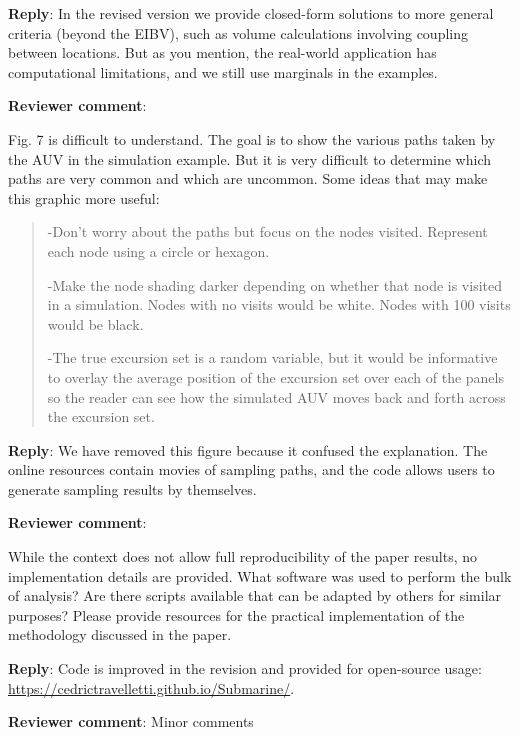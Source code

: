 \documentclass[a4paper]{article}
\def\revcom{\textbf{Reviewer comment}}
\def\reply{\textbf{Reply}}
\begin{document}
\begin{answers}
\reply: In the revised version we provide closed-form solutions to more general criteria (beyond the EIBV), such as volume calculations involving coupling between locations. But as you mention, the real-world application has computational limitations, and we still use marginals in the examples.  

\item{\revcom :}\label{r2c13}

Fig. 7 is difficult to understand. The goal is to show the various paths taken by the AUV in the
simulation example. But it is very difficult to determine which paths are very common and which
are uncommon. Some ideas that may make this graphic more useful:

\begin{quote}
-Don’t worry about the paths but focus on the nodes visited. Represent each node using a circle or hexagon.\par
-Make the node shading darker depending on whether that node is visited in a
simulation. Nodes with no visits would be white. Nodes with 100 visits would be black.\par
-The true excursion set is a random variable, but it would be informative to overlay the
average position of the excursion set over each of the panels so the reader can see how
the simulated AUV moves back and forth across the excursion set.
\end{quote}

\reply: We have removed this figure because it confused the explanation. The online resources contain movies of sampling paths, and the code allows users to generate sampling results by themselves. 

\item{\revcom :}\label{r2c14}

While the context does not allow full reproducibility of the paper results, no implementation details are provided. What software was used to perform the bulk of analysis? Are there scripts available that can be adapted by others for similar purposes? Please provide resources for the practical implementation of the methodology discussed in the paper.

\reply: Code is improved in the revision and provided for open-source usage: \url{https://cedrictravelletti.github.io/Submarine/}. 

\item{\revcom: Minor comments}\label{r2cminor}

\begin{itemize}[noitemsep,topsep=0pt,parsep=0pt,partopsep=0pt]


\end{itemize}
\end{answers}
\end{document}
